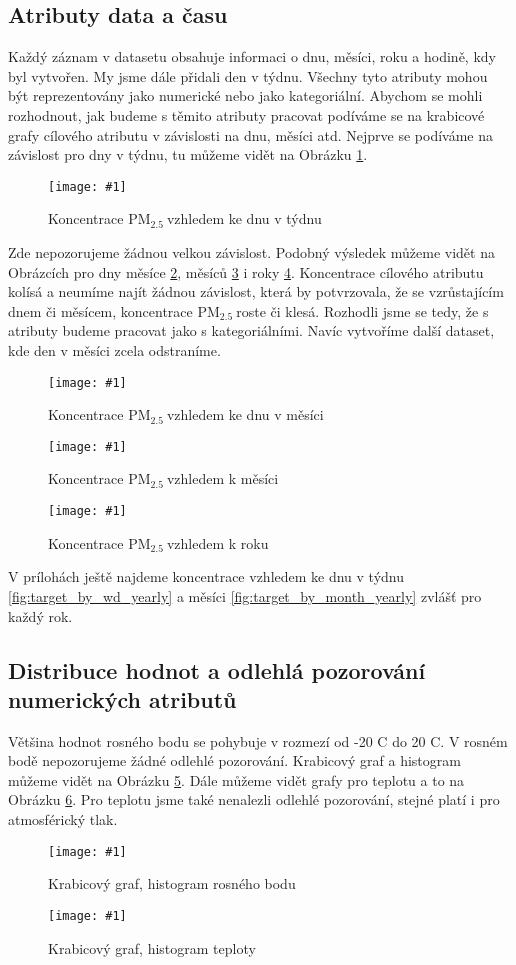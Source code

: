 \documentclass[a4paper,12pt]{article}
\newcommand{\pmQuant}[0]{$\text{PM}_{2.5}\:$}
\newcommand{\image}[4]{\begin{figure}[ht!] \centering \texttt{[image: \#1]} \caption{#2} \label{#3} \end{figure}}
\begin{document}
\subsection{Atributy data a času}
Každý záznam v datasetu obsahuje informaci o dnu, měsíci, roku a hodině, kdy byl vytvořen. My jsme dále přidali den v týdnu.
Všechny tyto atributy mohou být reprezentovány jako numerické nebo jako kategoriální. Abychom se mohli rozhodnout, 
jak budeme s těmito atributy pracovat podíváme se na krabicové grafy cílového atributu v závislosti na dnu, měsíci atd.
Nejprve se podíváme na závislost pro dny v týdnu, tu můžeme vidět na Obrázku \ref{fig:target_by_wd}.

\image{target_by_week_day.pdf}{Koncentrace \pmQuant vzhledem ke dnu v týdnu}{fig:target_by_wd}{1.0}

Zde nepozorujeme žádnou velkou závislost. Podobný výsledek můžeme vidět na Obrázcích pro dny měsíce \ref{fig:target_by_day}, 
měsíců \ref{fig:target_by_month} i roky \ref{fig:target_by_year}.
Koncentrace cílového atributu kolísá a neumíme najít žádnou závislost, která by potvrzovala, že se vzrůstajícím dnem či měsícem, koncentrace
\pmQuant roste či klesá. Rozhodli jsme se tedy, že s atributy budeme pracovat jako s kategoriálními.
Navíc vytvoříme další dataset, kde den v měsíci zcela odstraníme.

\image{target_by_month_day.pdf}{Koncentrace \pmQuant vzhledem ke dnu v měsíci}{fig:target_by_day}{1.0}
\image{target_by_month.pdf}{Koncentrace \pmQuant vzhledem k měsíci }{fig:target_by_month}{1.0}
\image{target_by_year.pdf}{Koncentrace \pmQuant vzhledem k roku}{fig:target_by_year}{1.0}

V prílohách ještě najdeme koncentrace vzhledem ke dnu v týdnu \ref{fig:target_by_wd_yearly} a měsíci \ref{fig:target_by_month_yearly} 
zvlášť pro každý rok.

\FloatBarrier
\subsection{Distribuce hodnot a odlehlá pozorování numerických atributů}
Většina hodnot rosného bodu se pohybuje v rozmezí od -20 \degree C do 20 \degree C. V rosném bodě nepozorujeme
žádné odlehlé pozorování. Krabicový graf a histogram můžeme vidět na Obrázku \ref{fig:dewpt_analys}. 
Dále můžeme vidět grafy pro teplotu a to na Obrázku \ref{fig:temp_analys}. Pro teplotu jsme také nenalezli
odlehlé pozorování, stejné platí i pro atmosférický tlak.

\image{dewpt.pdf}{Krabicový graf, histogram rosného bodu}{fig:dewpt_analys}{0.8}
\image{temp.pdf}{Krabicový graf, histogram teploty}{fig:temp_analys}{0.8}
\end{document}
